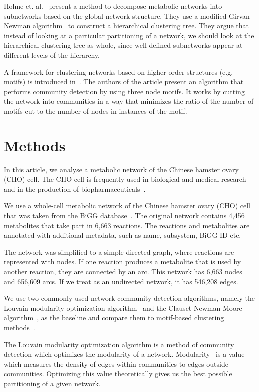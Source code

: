 Holme et. al.~\cite{holme2003subnetwork} present a method to decompose metabolic
networks into subnetworks based on the global network structure. They use a
modified Girvan-Newman algorithm~\cite{girvan2002community} to construct a
hierarchical clustering tree. They argue that instead of looking at a particular
partitioning of a network, we should look at the hierarchical clustering tree as
whole, since well-defined subnetworks appear at different levels of the
hierarchy.

A framework for clustering networks based on higher order structures
(e.g. motifs) is introduced in~\cite{benson2016higher}. The authors of the
article present an algorithm that performs community detection by using three
node motifs. It works by cutting the network into communities in a way that
minimizes the ratio of the number of motifs cut to the number of nodes in
instances of the motif.

\section{Methods}
\label{sec:methods}

In this article, we analyse a metabolic network of the Chinese hamster
ovary (CHO) cell. The CHO cell is frequently used in biological and medical
research and in the production of biopharmaceuticals~\cite{chocons}.

We use a whole-cell metabolic network of the Chinese hamster ovary (CHO)
cell that was taken from the BiGG database~\cite{bigg,chocons}. The original
network contains 4,456 metabolites that take part in 6,663 reactions. The
reactions and metabolites are annotated with additional metadata, such as name,
subsystem, BiGG ID etc.

The network was simplified to a simple directed graph, where reactions are
represented with nodes. If one reaction produces a metabolite that is used by
another reaction, they are connected by an arc. This network has 6,663 nodes and
656,609 arcs. If we treat as an undirected network, it has 546,208 edges.

We use two commonly used network community detection algorithms, namely the
Louvain modularity optimization algorithm~\cite{blondel2008fast} and the
Clauset-Newman-Moore algorithm~\cite{clauset2004finding}, as the baseline and
compare them to motif-based clustering methods~\cite{benson2016higher}.

The Louvain modularity optimization algorithm is a method of community detection
which optimizes the modularity of a network. Modularity~\cite{girvan2002community}
is a value which measures the density of edges within communities to edges outside 
communities. Optimizing this value theoretically gives us the best possible partitioning of a given network.

